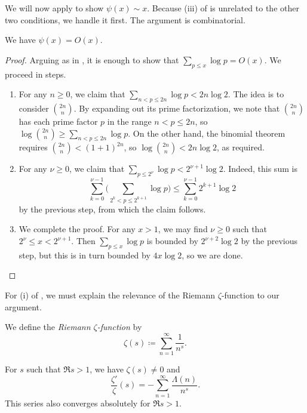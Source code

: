 \documentclass[../thesis.tex]{subfiles}
\begin{document}
We will now apply  to show $\psi(x)\sim x$. Because (iii) of  is unrelated to the other two conditions, we handle it first. The argument is combinatorial.
\begin{lemma}[Chebychev] \label{lem:cheby-prime-bound}
	We have $\psi(x)=O(x)$.
\end{lemma}
\begin{proof}
	Arguing as in , it is enough to show that $\sum_{p\le x}\log p=O(x)$. We proceed in steps.
	\begin{enumerate}
		\item For any $n\ge0$, we claim that $\sum_{n<p\le2n}\log p<2n\log2$. The idea is to consider $\binom{2n}n$. By expanding out its prime factorization, we note that $\binom{2n}n$ has each prime factor $p$ in the range $n<p\le2n$, so $\log\binom{2n}n\ge\sum_{n<p\le2n}\log p$. On the other hand, the binomial theorem requires $\binom{2n}n<(1+1)^{2n}$, so $\log\binom{2n}n<2n\log2$, as required.
		\item For any $\nu\ge0$, we claim that $\sum_{p\le2^\nu}\log p<2^{\nu+1}\log2$. Indeed, this sum is
		\[\sum_{k=0}^{\nu-1}\Bigg(\sum_{2^k<p\le 2^{k+1}}\log p\Bigg)\le\sum_{k=0}^{\nu-1}2^{k+1}\log2\]
		by the previous step, from which the claim follows.
		\item We complete the proof. For any $x>1$, we may find $\nu\ge0$ such that $2^\nu\le x<2^{\nu+1}$. Then $\sum_{p\le x}\log p$ is bounded by $2^{\nu+2}\log2$ by the previous step, but this is in turn bounded by $4x\log2$, so we are done.
		\qedhere
	\end{enumerate}
\end{proof}
For (i) of , we must explain the relevance of the Riemann $\zeta$-function to our argument.
\begin{defihelper} 
	We define the \textit{Riemann $\zeta$-function} by
	\[\zeta(s)\coloneqq\sum_{n=1}^\infty\frac1{n^s}.\]
\end{defihelper}
\begin{lemma} \label{lem:dlog-zeta}
	For $s$ such that $\Re s>1$, we have $\zeta(s)\ne0$ and
	\[\frac{\zeta'}\zeta(s)=-\sum_{n=1}^\infty\frac{\Lambda(n)}{n^s}.\]
	This series also converges absolutely for $\Re s>1$.
\end{lemma}
\end{document}
